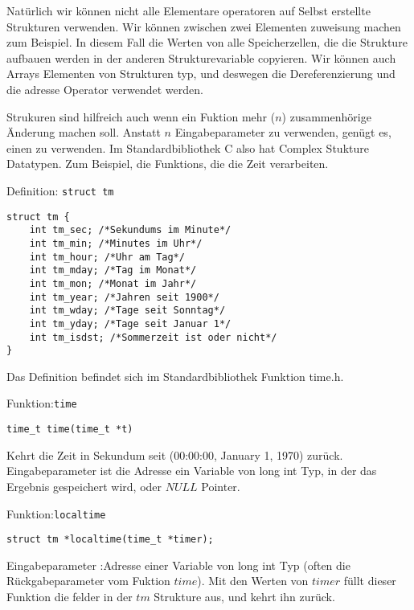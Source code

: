 Natürlich wir können nicht alle Elementare operatoren auf Selbst
erstellte Strukturen verwenden. Wir können zwischen zwei Elementen zuweisung machen zum Beispiel.
In diesem Fall die Werten von alle Speicherzellen, die die Strukture aufbauen werden in der
anderen Strukturevariable copyieren. Wir können auch Arrays  Elementen von Strukturen typ, 
und deswegen die Dereferenzierung und die adresse Operator verwendet werden.

Strukuren sind hilfreich auch wenn ein Fuktion mehr ($n$) zusammenhörige Änderung machen soll. 
Anstatt $n$ Eingabeparameter zu verwenden, genügt es, einen zu verwenden. Im Standardbibliothek
C also hat Complex Stukture Datatypen. Zum Beispiel, die Funktions, die die Zeit verarbeiten.

\begin{myexampleblock}{Definition: \texttt{struct tm}}
\begin{lstlisting}
struct tm {
    int tm_sec; /*Sekundums im Minute*/
    int tm_min; /*Minutes im Uhr*/
    int tm_hour; /*Uhr am Tag*/
    int tm_mday; /*Tag im Monat*/
    int tm_mon; /*Monat im Jahr*/
    int tm_year; /*Jahren seit 1900*/
    int tm_wday; /*Tage seit Sonntag*/
    int tm_yday; /*Tage seit Januar 1*/
    int tm_isdst; /*Sommerzeit ist oder nicht*/
}
\end{lstlisting}
Das Definition befindet sich im Standardbibliothek Funktion time.h.
\end{myexampleblock}
\begin{myexampleblock}{Funktion:\texttt{time}}
\begin{lstlisting}
time_t time(time_t *t)
\end{lstlisting}
\vspace{-0.4cm}
Kehrt die Zeit in Sekundum seit (00:00:00, January 1, 1970) zurück.
Eingabeparameter ist die Adresse ein Variable von long int Typ, in der
das Ergebnis gespeichert wird, oder $NULL$ Pointer.
\end{myexampleblock}
\begin{myexampleblock}{Funktion:\texttt{localtime}}
\begin{lstlisting}
struct tm *localtime(time_t *timer);
\end{lstlisting}
\vspace{-0.4cm}
Eingabeparameter :Adresse einer Variable von long int Typ (often die Rückgabeparameter vom Fuktion $time$).
Mit den Werten von $timer$ füllt dieser Funktion die felder in der $tm$ Strukture aus, und kehrt ihn zurück.
\end{myexampleblock}
